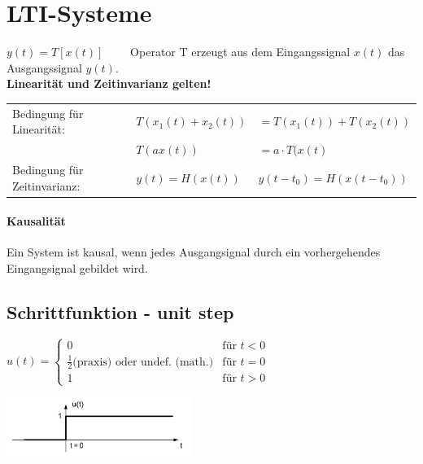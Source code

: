 \section{LTI-Systeme}
\begin{center}
	
\end{center}

$ y(t) = T [ x(t)] \qquad $ Operator T erzeugt aus dem Eingangssignal $ x(t) $ das Ausgangssignal $ y(t)$. \\
\textbf{Linearität und Zeitinvarianz gelten!}\\
\begin{tabular}{lll}
	Bedingung für Linearität: & $T(x_1(t)+x_2(t))$ & $= T(x_1(t)) + T(x_2(t))$ \\
	& $T(ax(t))$ & $= a\cdot T(x(t)$\\
	Bedingung für Zeitinvarianz: & $y(t) = H(x(t))$ & $y(t-t_0) = H(x(t-t_0))$ \\
\end{tabular}

	\paragraph{Kausalität} Ein System ist kausal, wenn jedes Ausgangsignal durch ein vorhergehendes Eingangsignal gebildet wird.
\\

\subsection{Schrittfunktion - unit step}
	\begin{minipage}{10cm}
		$u(t) =	\begin{cases}
	  		 0 & \text{für } t < 0 \\
	  		 \frac{1}{2} \text{(praxis)}  \text{ oder undef. (math.)} & \text{für } t = 0 \\
	  		 1 & \text{für } t > 0
	  	\end{cases}
		$
	\end{minipage}
	\begin{minipage}{8cm}
		\includegraphics[width=6cm]{bilder/unitstep.png}
	\end{minipage}


